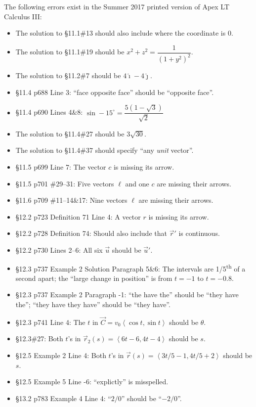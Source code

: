 \documentclass{amsart}
\newcommand{\bracket}[1]{\left\langle#1\right\rangle}
\begin{document}
The following errors exist in the Summer 2017 printed version of Apex LT Calculus III:
\begin{itemize}
\item The solution to \S11.1\#13 should also include where the coordinate is 0.
\item The solution to \S11.1\#19 should be $x^2+z^2=\dfrac1{(1+y^2)^2}$.\\[-.8\baselineskip]
\item The solution to \S11.2\#7 should be $4\hat\imath-4\hat\jmath$.
\item \S11.4 p688 Line 3: ``face opposite face'' should be ``opposite face''.
\item \S11.4 p690 Lines 4\&8: $\sin-15^\circ=\dfrac{5(1-\sqrt3)}{\sqrt2}$
\item The solution to \S11.4\#27 should be $3\sqrt{30}$.
\item The solution to \S11.4\#37 should specify ``any \emph{unit} vector''.
\item \S11.5 p699 Line 7: The vector $c$ is missing its arrow.
\item \S11.5 p701 \#29--31: Five vectors $\ell$ and one $c$ are missing their arrows.
\item \S11.6 p709 \#11--14\&17: Nine vectors $\ell$ are missing their arrows.
\item \S12.2 p723 Definition 71 Line 4: A vector $r$ is missing its arrow.
\item \S12.2 p728 Definition 74: Should also include that $\vec r'$ is continuous.
\item \S12.2 p730 Lines 2--6: All six $\vec u$ should be $\vec u'$.
\item \S12.3 p737 Example 2 Solution Paragraph 5\&6: The intervals are 1/5\textsuperscript{th} of a second apart; the ``large change in position'' is from $t=-1$ to $t=-0.8$.
\item \S12.3 p737 Example 2 Paragraph -1: ``the have the'' should be ``they have the''; ``they have they have'' should be ``they have''.
\item \S12.3 p741 Line 4: The $t$ in $\vec C = v_0\bracket{\cos t,\sin t}$ should be $\theta$.
\item \S12.3\#27: Both $t$'s in $\vec r_2(s)=\bracket{6t-6,4t-4}$ should be $s$.
\item \S12.5 Example 2 Line 4: Both $t$'s in $\vec r(s)=\bracket{3t/5-1, 4t/5+2}$ should be $s$.
\item \S12.5 Example 5 Line -6: ``explictly'' is misspelled.
\item \S13.2 p783 Example 4 Line 4: ``$2/0$'' should be ``$-2/0$''.

\end{itemize}
\end{document}
